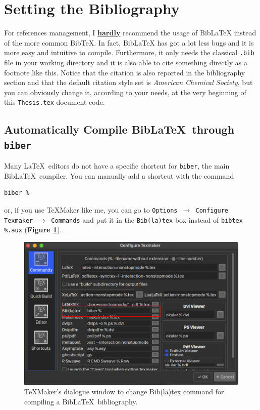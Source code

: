 \documentclass[12pt,a4paper,twoside]{book}
\begin{document}
\section*{Setting the Bibliography}
For references management, I \underline{\color{reddy} \bf hardly} recommend the usage of {\color{reddy} Bib\LaTeX}  instead of the more common Bib\TeX . In fact, {\color{reddy} Bib\LaTeX} has got a lot less bugs and it is more easy and intuitive to compile. Furthermore, it only needs the classical \verb|.bib| file in your working directory and it is also able to cite something directly as a footnote like this. Notice that the citation is also reported in the bibliography section and that the default citation style set is \textit{American Chemical Society}, but you can obviously change it, according to your needs, at the very beginning of this {\color{reddy} \verb|Thesis.tex|} document code.

\subsection*{Automatically Compile Bib\LaTeX \ through \tt biber}
Many \LaTeX \ editors do not have a specific shortcut for {\color{reddy} \verb|biber|}, the main Bib\LaTeX\ compiler. You can manually add a shortcut with the command
\begin{verbatim}
biber %
\end{verbatim}
 or, if you use \TeX Maker like me, you can go to {\color{reddy} \texttt{Options $\to$ Configure Texmaker $\to$ Commands}} and put it in the \verb|Bib(la)tex| box instead of \verb|bibtex %.aux| ({\color{reddy}\bf Figure \ref{window}}).

\begin{figure}[h]
\centering
\includegraphics[width=.7\textwidth]{biber}
\caption{\TeX Maker's dialogue window to change Bib(la)tex command for compiling a Bib\LaTeX\ bibliography.}
\label{window}
\end{figure}
\end{document}
